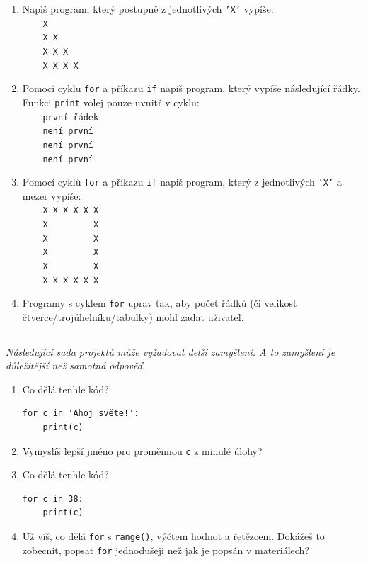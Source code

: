 \documentclass[a4paper,10pt]{article}
\newcommand\startsection[1]{
     \vspace{0.2ex}
    \hrule
    {\fontspec{Oxygen} \tiny
     \vspace{-1ex}
     \emph{#1}
     \vspace{-1.5em}
    }
}
\begin{document}
\begin{enumerate}[resume]
\item Napiš program, který postupně z jednotlivých \texttt{'X'} vypíše:
\\\verb+    X+
\\\verb+    X X+
\\\verb+    X X X+
\\\verb+    X X X X+

\item Pomocí cyklu \verb+for+ a příkazu \verb+if+ napiš program, který vypíše následující řádky. Funkci \texttt{print} volej pouze uvnitř v cyklu:
\\\verb+    první řádek+
\\\verb+    není první+
\\\verb+    není první+
\\\verb+    není první+

\item Pomocí cyklů \verb+for+ a příkazu \verb+if+ napiš program,
    který z jednotlivých \texttt{'X'} a mezer vypíše:
\\\verb+    X X X X X X+
\\\verb+    X         X+
\\\verb+    X         X+
\\\verb+    X         X+
\\\verb+    X         X+
\\\verb+    X X X X X X+

\item Programy s cyklem \verb+for+ uprav tak, aby počet řádků
    (či velikost čtverce/trojúhelníku/tabulky)
    mohl zadat uživatel.

\end{enumerate}

\startsection{Následující sada projektů může vyžadovat delší zamyšlení. A to zamyšlení je důležitější než samotná odpověď.}

\begin{enumerate}[resume]
\item Co dělá tenhle kód?
\begin{verbatim}
for c in 'Ahoj světe!':
    print(c)
\end{verbatim}

\item Vymyslíš lepší jméno pro proměnnou \verb+c+ z minulé úlohy?

\item Co dělá tenhle kód?
\begin{verbatim}
for c in 38:
    print(c)
\end{verbatim}

\item Už víš, co dělá \texttt{for} s \texttt{range()}, výčtem hodnot a řetězcem.
    Dokážeš to zobecnit, popsat \texttt{for} jednodušeji než jak je popsán v materiálech?

\end{enumerate}
\end{document}
